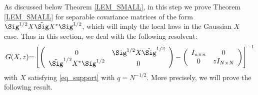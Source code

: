 As discussed below Theorem \ref{LEM_SMALL}, in this step we prove Theorem \ref{LEM_SMALL} for separable covariance matrices of the form $\Sig^{1/2} X \tilde \Sig X^* \Sig^{1/2}$, which will imply the local laws in the Gaussian $X$ case. Thus in this section, we deal with the following resolvent:
\begin{equation}\label{eqn_comparison1}
G(X,z) {=}  \left[\left( {\begin{array}{*{20}c}
   { 0 } & \Sig^{1/2} X \tilde \Sig^{1/2}   \\
   {\tilde\Sig^{1/2}X^*\Sig^{1/2} } & {0}  \\
   \end{array}} \right)-\left( {\begin{array}{*{20}c}
   { I_{n\times n}} & 0  \\
   0 & { zI_{N\times N}}  \\
\end{array}} \right)\right]^{-1}
\end{equation}
with $X$ satisfying \eqref{eq_support} with $q=N^{-1/2}$.
More precisely, we will prove the following result. 

